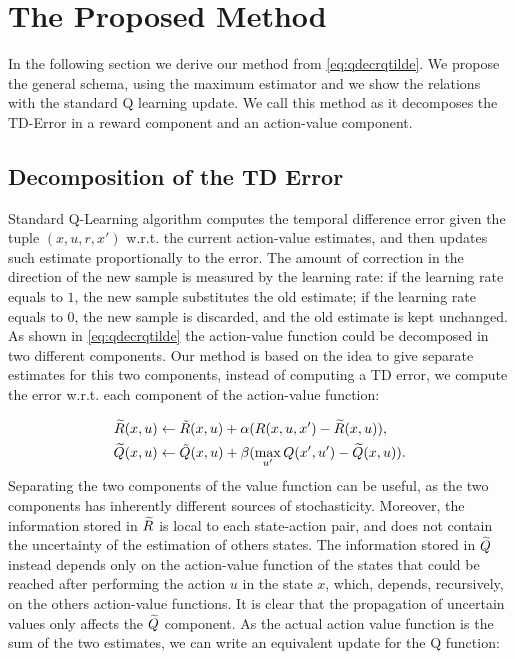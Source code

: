 \documentclass[conference]{IEEEtran}
\begin{document}
\section{The Proposed Method}

In the following section we derive our method from \ref{eq:qdecrqtilde}. We propose the general schema, using the maximum estimator and we show the relations with the standard Q learning update. We call this method \emph{\alg} as it decomposes the TD-Error in a reward component and an action-value component.

\subsection{Decomposition of the TD Error}

Standard Q-Learning algorithm computes the temporal difference error given the tuple $(x,u,r,x')$ w.r.t. the current action-value estimates, and then updates such estimate proportionally to the error. The amount of correction in the direction of the new sample is measured by the learning rate: if the learning rate equals to $1$, the new sample substitutes the old estimate; if the learning rate equals to $0$, the new sample is discarded, and the old estimate is kept unchanged. 
As shown in \ref{eq:qdecrqtilde} the action-value function could be decomposed in two different components. Our method is based on the idea to give separate estimates for this two components, instead of computing a TD error, we compute the error w.r.t. each component of the action-value function:

\begin{align}
\Rtilde(x,u) & \leftarrow\tilde{R}(x,u)+\alpha(R(x,u,x')-\Rtilde(x,u)), \label{eq:rtilupdedate}\\
\Qtilde(x,u) & \leftarrow\tilde{Q}(x,u)+\beta(\max_{u'}Q(x',u')-\Qtilde(x,u)).
\label{eq:qtildeupdate}
\end{align}
Separating the two components of the value function can be useful, as the two components has inherently different sources of stochasticity. Moreover, the information stored in $\widetilde{R}$ is local to each state-action pair, and does not contain the uncertainty of the estimation of others states. The information stored in $\widetilde{Q}$ instead depends only on the action-value function of the states that could be reached after performing the action $u$ in the state $x$, which, depends, recursively, on the others action-value functions. It is clear that the propagation of uncertain values only affects the $\widetilde{Q}$ component.
As the actual action value function is the sum of the two estimates, we can write an equivalent update for the Q function:
\end{document}
